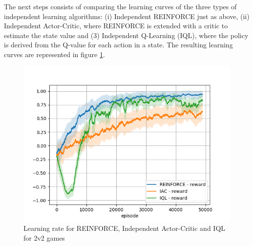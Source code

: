 The next steps consists of comparing the learning curves of the three types of independent learning algorithms: (i) Independent REINFORCE just as above, (ii) Independent Actor-Critic, where REINFORCE is extended with a critic to estimate the state value and (3) Independent Q-Learning (IQL), where the policy is derived from the Q-value for each action in a state. The resulting learning curves are represented in figure \ref{fig:compare_reward}.

\begin{figure}[htp]
    \centering
    \includegraphics[width=14cm]{images/experiment4/compare_reward.png}
    \caption{Learning rate for REINFORCE, Independent Actor-Critic and IQL for 2v2 games}
    \label{fig:compare_reward}
\end{figure}

